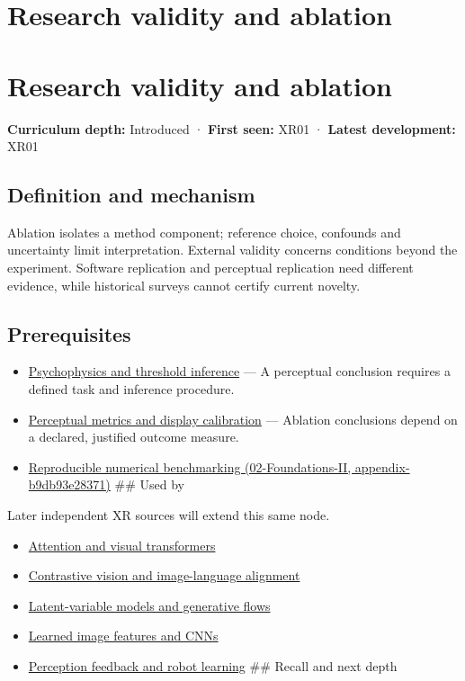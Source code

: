 \hypertarget{appendix-65788587ef78}{}
\section*{Research validity and ablation}
\section{Research validity and ablation}\label{research-validity-and-ablation}

\textbf{Curriculum depth:} Introduced · \textbf{First seen:} XR01 · \textbf{Latest development:} XR01

\subsection{Definition and mechanism}\label{definition-and-mechanism}

Ablation isolates a method component; reference choice, confounds and uncertainty limit interpretation. External validity concerns conditions beyond the experiment. Software replication and perceptual replication need different evidence, while historical surveys cannot certify current novelty.

\subsection{Prerequisites}\label{prerequisites}

\begin{itemize}
\item
  \hyperref[appendix-1759f03e8ce7]{Psychophysics and threshold inference} --- A perceptual conclusion requires a defined task and inference procedure.
\item
  \hyperref[appendix-b2c1846508bf]{Perceptual metrics and display calibration} --- Ablation conclusions depend on a declared, justified outcome measure.
\item
  \href{}{Reproducible numerical benchmarking (02-Foundations-II, appendix-b9db93e28371)} \#\# Used by
\end{itemize}

Later independent XR sources will extend this same node.

\begin{itemize}
\tightlist
\item
  \hyperref[appendix-a9d5dfdd164a]{Attention and visual transformers}
\item
  \hyperref[appendix-772f1fd96148]{Contrastive vision and image-language alignment}
\item
  \hyperref[appendix-2c568f05ee34]{Latent-variable models and generative flows}
\item
  \hyperref[appendix-47c51ea026fb]{Learned image features and CNNs}
\item
  \hyperref[appendix-b0c42da325f1]{Perception feedback and robot learning} \#\# Recall and next depth
\end{itemize}

